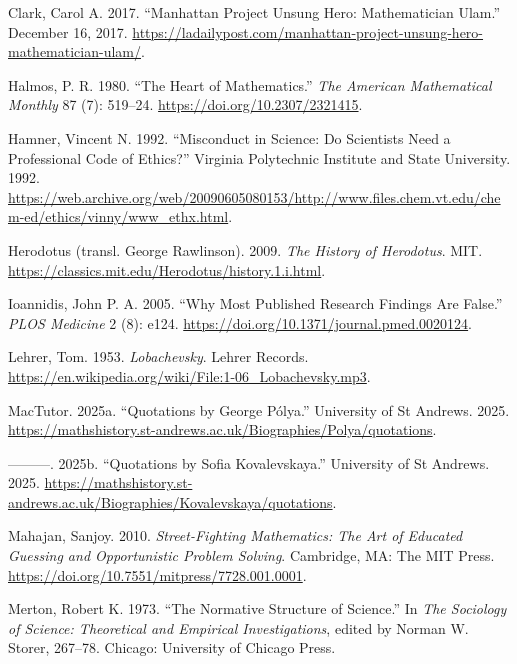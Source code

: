 \documentclass[
  a4paper,
  DIV=11,
  numbers=noendperiod,
  oneside]{scrreprt}
\newlength{\cslhangindent}
\newenvironment{CSLReferences}[2] %
 {\begin{list}{}{%
  \setlength{\itemindent}{0pt}
  \setlength{\leftmargin}{0pt}
  \setlength{\parsep}{0pt}
  \ifodd #1
   \setlength{\leftmargin}{\cslhangindent}
   \setlength{\itemindent}{-1\cslhangindent}
  \fi
  \setlength{\itemsep}{#2\baselineskip}}}
 {\end{list}}
\begin{document}
\label{refs}
\begin{CSLReferences}{1}{0}
Clark, Carol A. 2017. {``Manhattan Project Unsung Hero: Mathematician
Ulam.''} December 16, 2017.
\url{https://ladailypost.com/manhattan-project-unsung-hero-mathematician-ulam/}.

Halmos, P. R. 1980. {``The Heart of Mathematics.''} \emph{The American
Mathematical Monthly} 87 (7): 519--24.
\url{https://doi.org/10.2307/2321415}.

Hamner, Vincent N. 1992. {``Misconduct in Science: Do Scientists Need a
Professional Code of Ethics?''} {Virginia Polytechnic Institute and
State University}. 1992.
\url{https://web.archive.org/web/20090605080153/http://www.files.chem.vt.edu/chem-ed/ethics/vinny/www_ethx.html}.

Herodotus (transl. George Rawlinson). 2009. \emph{The History of
Herodotus}. MIT.
\url{https://classics.mit.edu/Herodotus/history.1.i.html}.

Ioannidis, John P. A. 2005. {``Why Most Published Research Findings Are
False.''} \emph{PLOS Medicine} 2 (8): e124.
\url{https://doi.org/10.1371/journal.pmed.0020124}.

Lehrer, Tom. 1953. \emph{Lobachevsky}. Lehrer Records.
\url{https://en.wikipedia.org/wiki/File:1-06_Lobachevsky.mp3}.

MacTutor. 2025a. {``Quotations by George {P}{ó}lya.''} University of St
Andrews. 2025.
\url{https://mathshistory.st-andrews.ac.uk/Biographies/Polya/quotations}.

---------. 2025b. {``Quotations by Sofia Kovalevskaya.''} University of
St Andrews. 2025.
\url{https://mathshistory.st-andrews.ac.uk/Biographies/Kovalevskaya/quotations}.

Mahajan, Sanjoy. 2010. \emph{Street-Fighting Mathematics: The Art of
Educated Guessing and Opportunistic Problem Solving}. Cambridge, MA: The
MIT Press. \url{https://doi.org/10.7551/mitpress/7728.001.0001}.

Merton, Robert K. 1973. {``The Normative Structure of Science.''} In
\emph{The Sociology of Science: Theoretical and Empirical
Investigations}, edited by Norman W. Storer, 267--78. Chicago:
University of Chicago Press.


\end{CSLReferences}
\end{document}
